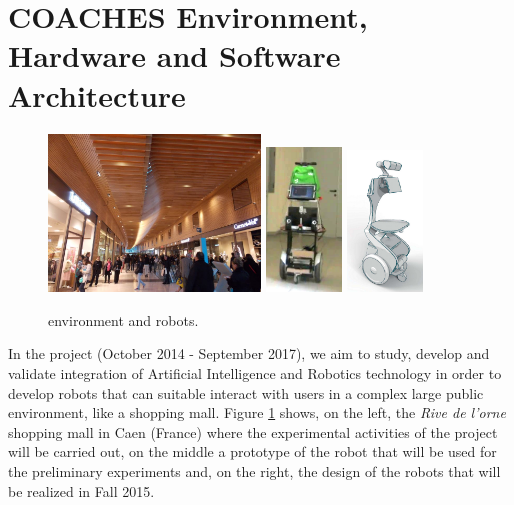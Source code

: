 \section{COACHES Environment, Hardware and Software Architecture}
\vspace{-0.1cm}
\begin{figure}[t!]
\centering
\includegraphics[height=4.2cm]{fig/rivedelorne}\hspace{0.1cm}\hfill
\includegraphics[width=0.18\textwidth]{fig/diago3}\hspace{0.1cm}\hfill
\includegraphics[width=0.18\textwidth]{fig/coaches_robot}
\caption{\coaches environment and robots.}
\label{fig:env}
\end{figure}

In the {\coaches} project (October 2014 - September 2017), we aim to study, develop and validate integration of Artificial Intelligence and Robotics technology in order to develop robots that can suitable interact with users in a complex large public environment, like a shopping mall.
Figure \ref{fig:env} shows, on the left, the \emph{Rive de l'orne} shopping mall in Caen (France) where the experimental activities of the project will be carried out, on the middle a prototype of the robot that will be used for the preliminary experiments and, on the right, the design of the robots that will be realized in Fall 2015.

